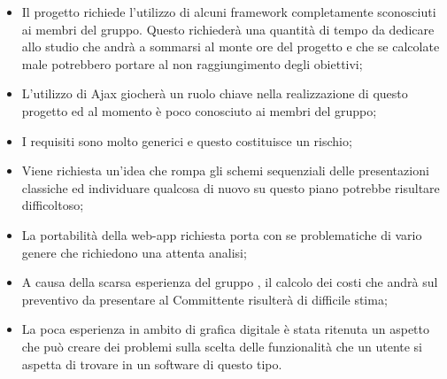 \begin{itemize}
	\item Il progetto \PROGETTO{} richiede l'utilizzo di alcuni framework completamente sconosciuti ai membri del gruppo. Questo richiederà una quantità di tempo da dedicare allo studio che andrà a sommarsi al monte ore del progetto e che se calcolate male potrebbero portare al non raggiungimento degli obiettivi;
	\item L'utilizzo di Ajax giocherà un ruolo chiave nella realizzazione di questo progetto ed al momento è poco conosciuto ai membri del gruppo;
	\item I requisiti sono molto generici e questo costituisce un rischio;
	\item Viene richiesta un'idea che rompa gli schemi sequenziali delle presentazioni classiche ed individuare qualcosa di nuovo su questo piano potrebbe risultare difficoltoso;
	\item La portabilità della web-app richiesta porta con se problematiche di vario genere che richiedono una attenta analisi;
	\item A causa della scarsa esperienza del gruppo \GRUPPO, il calcolo dei costi che andrà sul preventivo da presentare al Committente risulterà di difficile stima;
	\item La poca esperienza in ambito di grafica digitale è stata ritenuta un aspetto che può creare dei problemi sulla scelta delle funzionalità che un utente si aspetta di trovare in un software di questo tipo.
\end{itemize}

